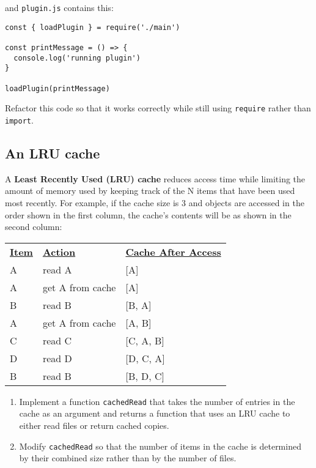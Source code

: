 \documentclass[krantzl]{krantz}
\newcommand{\glossref}[1]{\textbf{#1}}
\begin{document}
\noindent and \texttt{plugin.js} contains this:


\begin{lstlisting}[frame=single,frameround=tttt]
const { loadPlugin } = require('./main')

const printMessage = () => {
  console.log('running plugin')
}

loadPlugin(printMessage)
\end{lstlisting}



\noindent Refactor this code so that it works correctly while still using \texttt{require} rather than \texttt{import}.

\subsection*{An LRU cache}


A \glossref{Least Recently Used (LRU) cache}
reduces access time while limiting the amount of memory used
by keeping track of the N items that have been used most recently.
For example,
if the cache size is 3 and objects are accessed in the order shown in the first column,
the cache's contents will be as shown in the second column:


\vspace{\baselineskip}
\begin{tabular}{lll}
\textbf{\underline{Item}} & \textbf{\underline{Action}} & \textbf{\underline{Cache After Access}} \\
A & read A & [A] \\
A & get A from cache & [A] \\
B & read B & [B, A] \\
A & get A from cache & [A, B] \\
C & read C & [C, A, B] \\
D & read D & [D, C, A] \\
B & read B & [B, D, C] \\
\end{tabular}

\vspace{\baselineskip}

\begin{enumerate}

\item 

Implement a function \texttt{cachedRead} that takes the number of entries in the cache as an argument
    and returns a function that uses an LRU cache
    to either read files or return cached copies.



\item 

Modify \texttt{cachedRead} so that the number of items in the cache
    is determined by their combined size
    rather than by the number of files.



\end{enumerate}
\end{document}
